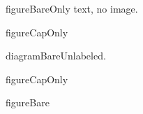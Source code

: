 


\begin{flmFloat}{figure}{Bare}Only text, no image.\end{flmFloat}

\begin{flmFloat}{figure}{CapOnly}\caption{One}\end{flmFloat}

\begin{flmFloat}{diagram}{Bare}Unlabeled.\end{flmFloat}

\begin{flmFloat}{figure}{CapOnly}\caption{Zed}\end{flmFloat}

\begin{flmFloat}{figure}{Bare}\flmLabels{\label{ref1}}\end{flmFloat}

